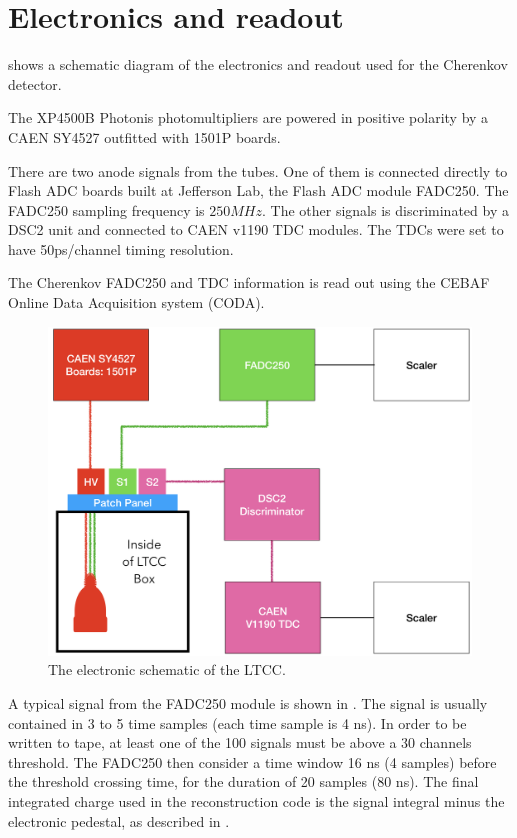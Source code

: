 \section{Electronics and readout}

 shows a schematic diagram of the electronics and readout used for the Cherenkov detector.

The XP4500B Photonis photomultipliers are powered in positive polarity by a CAEN SY4527 outfitted with 1501P boards.

There are two anode signals from the tubes. One of them is connected directly to Flash ADC
boards built at Jefferson Lab, the Flash ADC module FADC250. The FADC250 sampling frequency is $250 MHz$. The other signals is discriminated by a DSC2 unit and connected to CAEN v1190 TDC modules.
The TDCs were set to have 50ps/channel timing resolution.

The Cherenkov FADC250 and TDC information is read out using the CEBAF Online Data Acquisition system (CODA).

\begin{figure}
	\centering
	\includegraphics[width=0.95\columnwidth,keepaspectratio]{img/electronicScheme.png}
	\caption{The electronic schematic of the LTCC.}
	\label{fig:electronicScheme}
\end{figure}





A typical signal from the FADC250 module is shown in . The signal is usually contained in 3 to 5 time samples (each time sample is 4 ns).
In order to be written to tape, at least one of the 100 signals must be above a 30 channels threshold. The FADC250 then consider a time window 16 ns (4 samples)
before the threshold crossing time, for the duration of 20 samples (80 ns). The final integrated charge used in the reconstruction code is the signal integral
minus the electronic pedestal, as described in .



